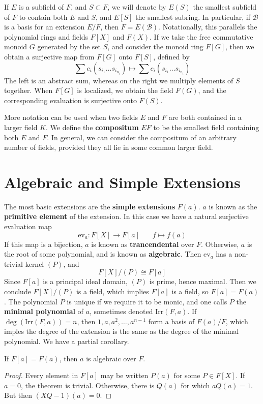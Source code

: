 If $E$ is a subfield of $F$, and $S \subset F$, we will denote by $E(S)$ the smallest subfield of $F$ to contain both $E$ and $S$, and $E[S]$ the smallest subring. In particular, if $\mathcal{B}$ is a basis for an extension $E/F$, then $F = E(\mathcal{B})$. Notationally, this parallels the polynomial rings and fields $F[X]$ and $F(X)$. If we take the free commutative monoid $G$ generated by the set $S$, and consider the monoid ring $F[G]$, then we obtain a surjective map from $F[G]$ onto $F[S]$, defined by
%
\[ \sum c_i (s_{i_1} \dots s_{i_{n_i}}) \mapsto \sum c_i (s_{i_1} \dots s_{i_{n_i}}) \]
%
The left is an abstract sum, whereas on the right we multiply elements of $S$ together. When $F[G]$ is localized, we obtain the field $F(G)$, and the corresponding evaluation is surjective onto $F(S)$.

More notation can be used when two fields $E$ and $F$ are both contained in a larger field $K$. We define the {\bf compositum} $EF$ to be the smallest field containing both $E$ and $F$. In general, we can consider the compositum of an arbitrary number of fields, provided they all lie in some common larger field.

\section{Algebraic and Simple Extensions}

The most basic extensions are the {\bf simple extensions} $F(a)$. $a$ is known as the {\bf primitive element} of the extension. In this case we have a natural surjective evaluation map
%
\[ \text{ev}_a: F[X] \to F[a]\ \ \ \ \ \ \ \ f \mapsto f(a) \]
%
If this map is a bijection, $a$ is known as {\bf trancendental} over $F$. Otherwise, $a$ is the root of some polynomial, and is known as {\bf algebraic}. Then $\text{ev}_a$ has a non-trivial kernel $(P)$, and
%
\[ F[X]/(P) \cong F[a] \]
%
Since $F[a]$ is a principal ideal domain, $(P)$ is prime, hence maximal. Then we conclude $F[X]/(P)$ is a field, which implies $F[a]$ is a field, so $F[a] = F(a)$. The polynomial $P$ is unique if we require it to be monic, and one calls $P$ the {\bf minimal polynomial} of $a$, sometimes denoted $\text{Irr}(F,a)$. If $\deg(\text{Irr}(F,a)) = n$, then $1, a, a^2, \dots, a^{n-1}$ form a basis of $F(a)/F$, which imples the degree of the extension is the same as the degree of the minimal polynomial. We have a partial corollary.

\begin{lemma}
    If $F[a] = F(a)$, then $a$ is algebraic over $F$.
\end{lemma}
\begin{proof}
    Every element in $F[a]$ may be written $P(a)$ for some $P \in F[X]$. If $a = 0$, the theorem is trivial. Otherwise, there is $Q(a)$ for which $aQ(a) = 1$. But then $(XQ - 1)(a) = 0$.
\end{proof}

